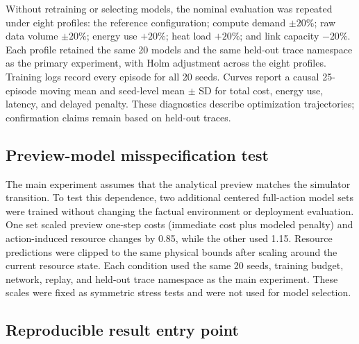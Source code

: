 \documentclass[11pt]{article}
\begin{document}
Without retraining or selecting models, the nominal evaluation was repeated under eight profiles: the reference configuration; compute demand $\pm20\%$; raw data volume $\pm20\%$; energy use $+20\%$; heat load $+20\%$; and link capacity $-20\%$. Each profile retained the same 20 models and the same held-out trace namespace as the primary experiment, with Holm adjustment across the eight profiles. Training logs record every episode for all 20 seeds. Curves report a causal 25-episode moving mean and seed-level mean $\pm$ SD for total cost, energy use, latency, and delayed penalty. These diagnostics describe optimization trajectories; confirmation claims remain based on held-out traces.

\subsection{Preview-model misspecification test}

\color{red}%
The main experiment assumes that the analytical preview matches the simulator transition. To test this dependence, two additional centered full-action model sets were trained without changing the factual environment or deployment evaluation. One set scaled preview one-step costs (immediate cost plus modeled penalty) and action-induced resource changes by 0.85, while the other used 1.15. Resource predictions were clipped to the same physical bounds after scaling around the current resource state. Each condition used the same 20 seeds, training budget, network, replay, and held-out trace namespace as the main experiment. These scales were fixed as symmetric stress tests and were not used for model selection.
\color{black}%

\subsection{Reproducible result entry point}
\end{document}
